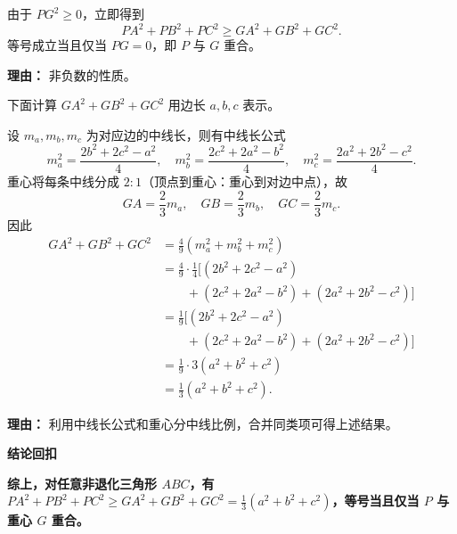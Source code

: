 \begin{proofbox}
\begin{description}[style=nextline, leftmargin=2.8em, labelsep=0.5em, itemsep=0.55em]
		\item[\textbf{步骤六（最小值结论）：}] 由于 $PG^2 \ge 0$，立即得到
			\[
				PA^2+PB^2+PC^2 \ge GA^2+GB^2+GC^2.
			\]
			等号成立当且仅当 $PG=0$，即 $P$ 与 $G$ 重合。
			\par\textbf{理由：} 非负数的性质。

		\item[\textbf{步骤七（重心距离公式）：}] 下面计算 $GA^2+GB^2+GC^2$ 用边长 $a,b,c$ 表示。

			设 $m_a, m_b, m_c$ 为对应边的中线长，则有中线长公式
			\[
				m_a^2 = \frac{2b^2+2c^2-a^2}{4},\quad
				m_b^2 = \frac{2c^2+2a^2-b^2}{4},\quad
				m_c^2 = \frac{2a^2+2b^2-c^2}{4}.
			\]
			重心将每条中线分成 $2:1$（顶点到重心：重心到对边中点），故
			\[
				GA = \frac23 m_a,\quad GB = \frac23 m_b,\quad GC = \frac23 m_c.
			\]
			因此
			\[
				\begin{aligned}
					GA^2+GB^2+GC^2
					&= \frac{4}{9}(m_a^2+m_b^2+m_c^2) \\
					&= \frac{4}{9}\cdot\frac{1}{4}\bigl[(2b^2+2c^2-a^2) \\
					&\qquad + (2c^2+2a^2-b^2) + (2a^2+2b^2-c^2)\bigr]\\
					&= \frac{1}{9}\bigl[(2b^2+2c^2-a^2) \\
					&\qquad + (2c^2+2a^2-b^2) + (2a^2+2b^2-c^2)\bigr]\\
					&= \frac{1}{9}\cdot 3(a^2+b^2+c^2) \\
					&= \frac13(a^2+b^2+c^2).
			\end{aligned}
			\]
			\par\textbf{理由：} 利用中线长公式和重心分中线比例，合并同类项可得上述结果。
	\end{description}

	\medskip
	\textbf{\textcolor{CProof}{结论回扣}}

	\textbf{综上，对任意非退化三角形 $ABC$，有 $\displaystyle PA^2+PB^2+PC^2 \ge GA^2+GB^2+GC^2 = \frac13(a^2+b^2+c^2)$，等号当且仅当 $P$ 与重心 $G$ 重合。}
\end{proofbox}
